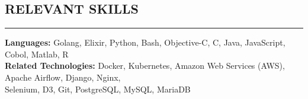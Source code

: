 \documentclass{res}
\begin{document}
\begin{resume}
		\section{{RELEVANT SKILLS}}
    \noindent\rule[0.5ex]{\linewidth}{1pt}
			{\bf Languages:} Golang, Elixir, Python, Bash, Objective-C, C, Java, JavaScript, Cobol, Matlab, R \\
			{\bf Related Technologies:} Docker, Kubernetes, Amazon Web Services (AWS), Apache Airflow, Django, Nginx,\ \\ Selenium, D3, Git, PostgreSQL, MySQL, MariaDB

	\end{resume}
\end{document}
